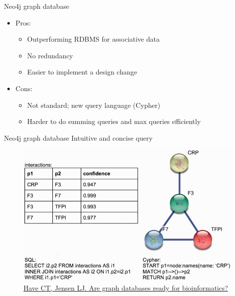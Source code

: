 \documentclass{beamer}
\begin{document}
\begin{frame}{Neo4j graph database}

\begin{itemize}
    \item Pros:
    \begin{itemize}
        \item Outperforming RDBMS for associative data
        \item No redundancy %
        \item Easier to implement a design change
    \end{itemize}
    \vfill
    \item Cons:
    \begin{itemize}
        \item Not standard; new query language (Cypher)
        \item Harder to do summing queries and max queries efficiently %
    \end{itemize}
\end{itemize}
\end{frame}

\begin{frame}{Neo4j graph database}
Intuitive and concise query

    \begin{figure}
        \centering
        \includegraphics[width=0.7\linewidth]{relational_vs_graph.jpg}
        \caption{\href{https://www.ncbi.nlm.nih.gov/pmc/articles/PMC3842757/}{Have CT, Jensen LJ. Are graph databases ready for bioinformatics?}}
    \end{figure}
\end{frame}
\end{document}
